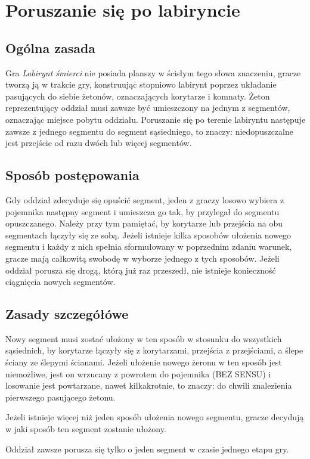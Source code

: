 \section{Poruszanie się po labiryncie}
\subsection{Ogólna zasada}
Gra \textit{Labirynt śmierci} nie posiada planszy w ścisłym tego słowa znaczeniu, gracze tworzą ją w trakcie gry, konstruując stopniowo labirynt poprzez układanie pasujących do siebie żetonów, oznaczających korytarze i komnaty.
Żeton reprezentujący oddział musi zawsze być umieszczony na jednym z segmentów, oznaczając miejsce pobytu oddziału.
Poruszanie się po terenie labiryntu następuje zawsze z jednego segmentu do segment sąsiedniego, to znaczy: niedopuszczalne jest przejście od razu dwóch lub więcej segmentów.

\subsection{Sposób postępowania}
Gdy oddział zdecyduje się opuścić segment, jeden z graczy losowo wybiera z pojemnika następny segment i umieszcza go tak, by przylegał do segmentu opuszczanego.
Należy przy tym pamiętać, by korytarze lub przejścia na obu segmentach łączyły się ze sobą.
Jeżeli istnieje kilka sposobów ułożenia nowego segmentu i każdy z nich spełnia sformułowany w poprzednim zdaniu warunek, gracze mają całkowitą swobodę w wyborze jednego z tych sposobów.
Jeżeli oddział porusza się drogą, którą już raz przeszedł, nie istnieje konieczność ciągnięcia nowych segmentów.

\subsection{Zasady szczegółówe}
Nowy segment musi zostać ułożony w ten sposób w stosunku do wszystkich sąsiednich, by korytarze łączyły się z korytarzami, przejścia z przejściami, a ślepe ściany ze ślepymi ścianami.
Jeżeli ułożenie nowego żeronu w ten sposób jest niemożliwe, jest on wrzucany z powrotem do pojemnika (BEZ SENSU) i losowanie jest powtarzane, nawet kilkakrotnie, to znaczy: do chwili znalezienia pierwszego pasującego żetonu.

Jeżeli istnieje więcej niż jeden sposób ułożenia nowego segmentu, gracze decydują w jaki sposób ten segment zostanie ułożony.

Oddział zawsze porusza się tylko o jeden segment w czasie jednego etapu gry.

